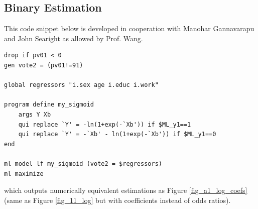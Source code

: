     \begin{samepage}
        \subsection{Binary Estimation}\label{subsec_bin_man_est}
            This code snippet below is developed in cooperation with Manohar Gannavarapu and John Searight as allowed by Prof. Wang.
                \begin{verbatim}
drop if pv01 < 0
gen vote2 = (pv01!=91)

global regressors "i.sex age i.educ i.work"

program define my_sigmoid
    args Y Xb
    qui replace `Y' = -ln(1+exp(-`Xb')) if $ML_y1==1
    qui replace `Y' = -`Xb' - ln(1+exp(-`Xb')) if $ML_y1==0
end

ml model lf my_sigmoid (vote2 = $regressors)
ml maximize
                 \end{verbatim}
            which outputs numerically equivalent estimations as Figure \ref{fig_a1_log_coefs} (same as Figure \ref{fig_11_log} but with coefficients instead of odds ratios).
        \end{samepage}
